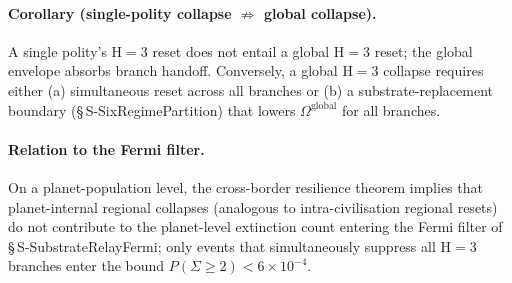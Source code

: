 \documentclass[11pt]{article}
\begin{document}
\paragraph{Corollary (single-polity collapse $\not\Rightarrow$ global collapse).} A single polity's H$=3$ reset does not entail a global H$=3$ reset; the global envelope absorbs branch handoff. Conversely, a global H$=3$ collapse requires either (a) simultaneous reset across all branches or (b) a substrate-replacement boundary (\S\,S-SixRegimePartition) that lowers $\Omega^{\mathrm{global}}$ for all branches.

\paragraph{Relation to the Fermi filter.} On a planet-population level, the cross-border resilience theorem implies that planet-internal regional collapses (analogous to intra-civilisation regional resets) do not contribute to the planet-level extinction count entering the Fermi filter of \S\,S-SubstrateRelayFermi; only events that simultaneously suppress all H$=3$ branches enter the bound $P(\Sigma\geq 2)<6\times 10^{-4}$.

\end{document}
